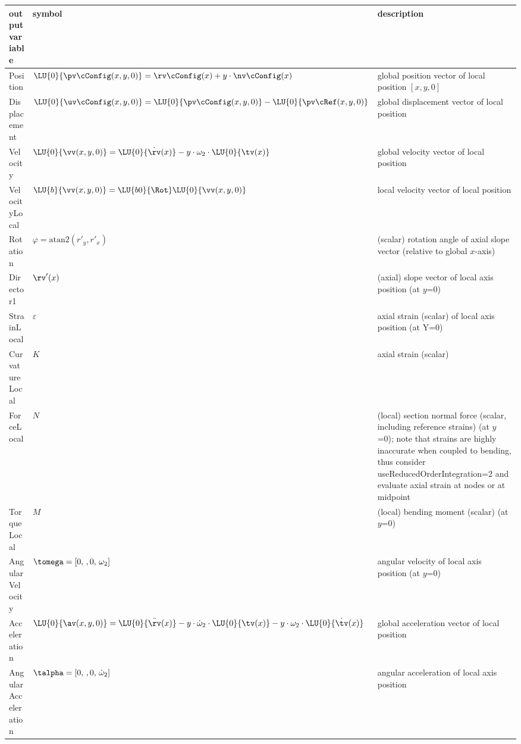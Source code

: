 \begin{center}
\footnotesize
\begin{longtable}{| p{5cm} | p{5cm} | p{6cm} |} 
\hline
\bf output variable & \bf symbol & \bf description \\ \hline
Position & $\LU{0}{\pv\cConfig(x,y,0)} = \rv\cConfig(x) + y\cdot \nv\cConfig(x)$ & global position vector of local position $[x,y,0]$\\ \hline
Displacement & $\LU{0}{\uv\cConfig(x,y,0)} = \LU{0}{\pv\cConfig(x,y,0)} - \LU{0}{\pv\cRef(x,y,0)}$ & global displacement vector of local position\\ \hline
Velocity & $\LU{0}{\vv(x,y,0)} = \LU{0}{\dot \rv(x)} - y \cdot \omega_2 \cdot\LU{0}{\tv(x)} $ & global velocity vector of local position\\ \hline
VelocityLocal & $\LU{b}{\vv(x,y,0)} = \LU{b0}{\Rot}\LU{0}{\vv(x,y,0)}$ & local velocity vector of local position\\ \hline
Rotation & $\varphi = \mathrm{atan2}(r'_y, r'_x)$ & (scalar) rotation angle of axial slope vector (relative to global $x$-axis)\\ \hline
Director1 & $\rv'(x)$ & (axial) slope vector of local axis position (at $y$=0)\\ \hline
StrainLocal & $\varepsilon$ & axial strain (scalar) of local axis position (at Y=0)\\ \hline
CurvatureLocal & $K$ & axial strain (scalar)\\ \hline
ForceLocal & $N$ &  (local) section normal force (scalar, including reference strains) (at $y$=0); note that strains are highly inaccurate when coupled to bending, thus consider useReducedOrderIntegration=2 and evaluate axial strain at nodes or at midpoint\\ \hline
TorqueLocal & $M$ &  (local) bending moment (scalar) (at $y$=0)\\ \hline
AngularVelocity & $\tomega = [0,\, ,0,\, \omega_2]$ & angular velocity of local axis position (at $y$=0)\\ \hline
Acceleration & $\LU{0}{\av(x,y,0)} = \LU{0}{\ddot \rv(x)} - y \cdot \dot\omega_2 \cdot\LU{0}{\tv(x)}- y \cdot \omega_2 \cdot\LU{0}{\dot\tv(x)} $ & global acceleration vector of local position\\ \hline
AngularAcceleration & $\talpha = [0,\, ,0,\, \dot\omega_2]$ & angular acceleration of local axis position\\ \hline
\end{longtable}
\end{center}
